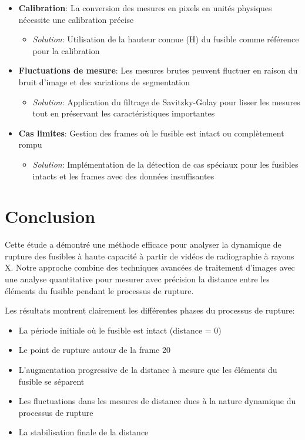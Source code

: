 \documentclass[12pt,a4paper]{article}
\begin{document}
\begin{itemize}
    \item \textbf{Calibration}: La conversion des mesures en pixels en unités physiques nécessite une calibration précise
    \begin{itemize}
        \item \textit{Solution}: Utilisation de la hauteur connue (H) du fusible comme référence pour la calibration
    \end{itemize}
    
    \item \textbf{Fluctuations de mesure}: Les mesures brutes peuvent fluctuer en raison du bruit d'image et des variations de segmentation
    \begin{itemize}
        \item \textit{Solution}: Application du filtrage de Savitzky-Golay pour lisser les mesures tout en préservant les caractéristiques importantes
    \end{itemize}
    
    \item \textbf{Cas limites}: Gestion des frames où le fusible est intact ou complètement rompu
    \begin{itemize}
        \item \textit{Solution}: Implémentation de la détection de cas spéciaux pour les fusibles intacts et les frames avec des données insuffisantes
    \end{itemize}
\end{itemize}

\section{Conclusion}

Cette étude a démontré une méthode efficace pour analyser la dynamique de rupture des fusibles à haute capacité à partir de vidéos de radiographie à rayons X. Notre approche combine des techniques avancées de traitement d'images avec une analyse quantitative pour mesurer avec précision la distance entre les éléments du fusible pendant le processus de rupture.

Les résultats montrent clairement les différentes phases du processus de rupture:
\begin{itemize}
    \item La période initiale où le fusible est intact (distance = 0)
    \item Le point de rupture autour de la frame 20
    \item L'augmentation progressive de la distance à mesure que les éléments du fusible se séparent
    \item Les fluctuations dans les mesures de distance dues à la nature dynamique du processus de rupture
    \item La stabilisation finale de la distance
\end{itemize}
\end{document}
